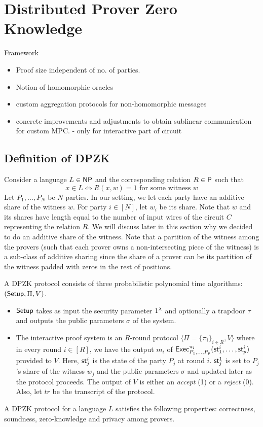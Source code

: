 \section{Distributed Prover Zero Knowledge}
Framework
\begin{itemize}
\item Proof size independent of no. of parties.
\item Notion of homomorphic oracles
\item custom aggregation protocols for non-homomorphic messages
\item concrete improvements and adjustments to obtain sublinear communication for custom MPC. - only for interactive part of circuit
\end{itemize}

\subsection{Definition of DPZK}
Consider a language $L \in \mathsf{NP}$ and the corresponding relation $R \in \mathsf{P}$ such that
\[
x \in L \Leftrightarrow R(x, w)=1 \text{ for some witness } w
\]
Let $P_1, \ldots, P_N$ be $N$ parties. In our setting, we let each party have an additive share of the witness $w$. For party $i \in [N]$, let $w_i$ be its share.  Note that $w$ and its shares have length equal to the number of input wires of the circuit $C$ representing the relation $R$. We will discuss later in this section why we decided to do an additive share of the witness. Note that a partition of the witness among the provers (such that each prover owns a non-intersecting piece of the witness) is a sub-class of additive sharing since the share of a prover can be its partition of the witness padded with zeros in the rest of positions.


A DPZK protocol consists of three probabilistic polynomial time algorithms: $(\mathsf{Setup}, \Pi, V)$. 
\begin{itemize}
\item $\mathsf{Setup}$ takes as input the security parameter $1^{\lambda}$ and optionally a trapdoor $\tau$ and outputs the public parameters $\sigma$ of the system.
\item The interactive proof system is an $R$-round protocol $\langle \Pi = \{\pi_i\}_{i \in R}, V \rangle$ where in every round $i \in [R]$, we have the output $m_i$ of $\mathsf{Exec}^{\pi_i}_{P_1, \ldots, P_p}(\mathsf{st}^i_1, \ldots, \mathsf{st}^i_p)$ provided to $V$. Here, $\mathsf{st}^i_j$ is the state of the party $P_j$ at round $i$. $\mathsf{st}^1_j$ is set to $P_j$'s share of the witness $w_j$ and the public parameters $\sigma$ and updated later as the protocol proceeds. The output of $V$ is either an \textit{accept} (1) or a \textit{reject} (0). Also, let $tr$ be the transcript of the protocol.
\end{itemize}
A DPZK protocol for a language $L$
satisfies the following properties: 
correctness, soundness, zero-knowledge and privacy among provers.
